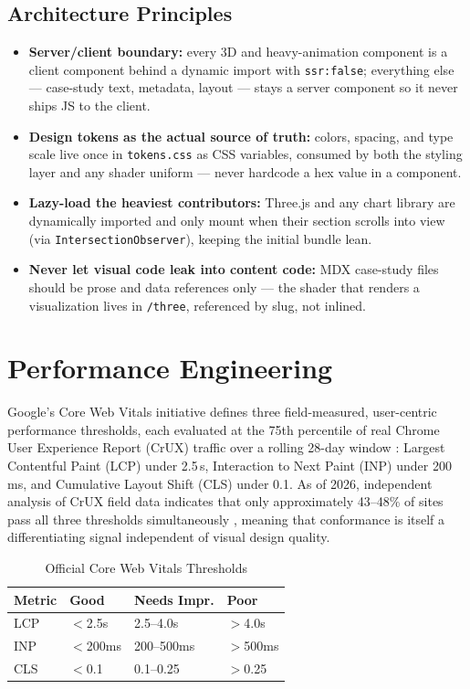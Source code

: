 \documentclass[conference]{IEEEtran}
\begin{document}
\subsection{Architecture Principles}
\begin{itemize}[leftmargin=*]
\item \textbf{Server/client boundary:} every 3D and heavy-animation component is a client component behind a dynamic import with \texttt{ssr:false}; everything else --- case-study text, metadata, layout --- stays a server component so it never ships JS to the client.
\item \textbf{Design tokens as the actual source of truth:} colors, spacing, and type scale live once in \texttt{tokens.css} as CSS variables, consumed by both the styling layer and any shader uniform --- never hardcode a hex value in a component.
\item \textbf{Lazy-load the heaviest contributors:} Three.js and any chart library are dynamically imported and only mount when their section scrolls into view (via \texttt{IntersectionObserver}), keeping the initial bundle lean.
\item \textbf{Never let visual code leak into content code:} MDX case-study files should be prose and data references only --- the shader that renders a visualization lives in \texttt{/three}, referenced by slug, not inlined.
\end{itemize}

\section{Performance Engineering}

Google's Core Web Vitals initiative defines three field-measured, user-centric performance thresholds, each evaluated at the 75th percentile of real Chrome User Experience Report (CrUX) traffic over a rolling 28-day window \cite{google_cwv}: Largest Contentful Paint (LCP) under 2.5\,s, Interaction to Next Paint (INP) under 200\,ms, and Cumulative Layout Shift (CLS) under 0.1. As of 2026, independent analysis of CrUX field data indicates that only approximately 43--48\% of sites pass all three thresholds simultaneously \cite{senorit_cwv, digitalapplied_cwv}, meaning that conformance is itself a differentiating signal independent of visual design quality.

\begin{table}[h]
\centering
\caption{Official Core Web Vitals Thresholds}
\label{tab:cwv_full}
\begin{tabular}{L{1.2cm}C{1.0cm}C{1.4cm}C{1.0cm}}
\toprule
\textbf{Metric} & \textbf{Good} & \textbf{Needs Impr.} & \textbf{Poor} \\
\midrule
LCP & $<$2.5s & 2.5--4.0s & $>$4.0s \\
INP & $<$200ms & 200--500ms & $>$500ms \\
CLS & $<$0.1 & 0.1--0.25 & $>$0.25 \\
\bottomrule
\end{tabular}
\end{table}
\end{document}
